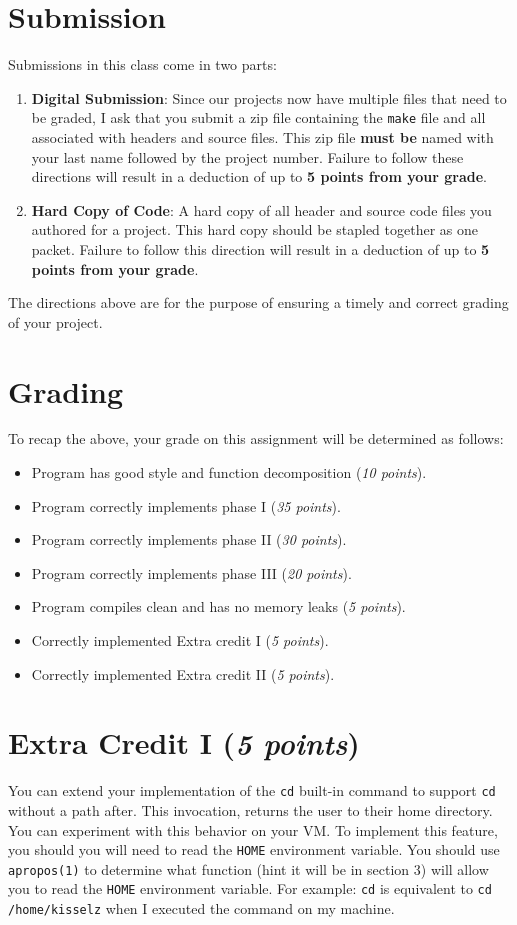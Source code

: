 \documentclass [12pt, letterpaper] {article}
\begin{document}
\section*{Submission}
Submissions in this class come in two parts:
\begin{enumerate}
  \item \textbf{Digital Submission}: Since our projects now have multiple files
  that need to be graded, I ask that you submit a zip file containing the \texttt{make}
  file and all associated with headers and source files.
  This zip file \textbf{must be} named with your last name followed by the project number.  Failure to follow
  these directions will result in a deduction of up to \textbf{5 points from your grade}.
  \item \textbf{Hard Copy of Code}: A hard copy of all header and source code
  files you authored for a project. This hard copy should be stapled together as
  one packet. Failure to follow this direction will result in a deduction of
  up to \textbf{5 points from your grade}.
\end{enumerate}
The directions above are for the purpose of ensuring a timely and correct
grading of your project.

\section*{Grading}
To recap the above, your grade on this assignment will be determined as follows:
\begin{itemize}
 \item Program has good style and function decomposition (\emph{10 points}).
 \item Program correctly implements phase I (\emph{35 points}).
 \item Program correctly implements phase II (\emph{30 points}).
 \item Program correctly implements phase III (\emph{20 points}).
 \item Program compiles clean and has no memory leaks (\emph{5 points}).
 \item Correctly implemented Extra credit I (\emph{5 points}).
 \item Correctly implemented Extra credit II (\emph{5 points}).
\end{itemize}

\section*{Extra Credit I (\emph{5 points})}
You can extend your implementation of the \texttt{cd} built-in command to support
\texttt{cd} without a path after. This invocation, returns the user
to their home directory. You can experiment with this behavior on your VM. To implement
this feature, you should you will need to
read the \verb#HOME# environment variable. You should use \texttt{apropos(1)} to
determine what function (hint it will be in section 3) will allow you to read the
\verb#HOME# environment variable. For example:
\texttt{cd} is equivalent to \texttt{cd /home/kisselz} when I executed the command on my machine.
\end{document}
